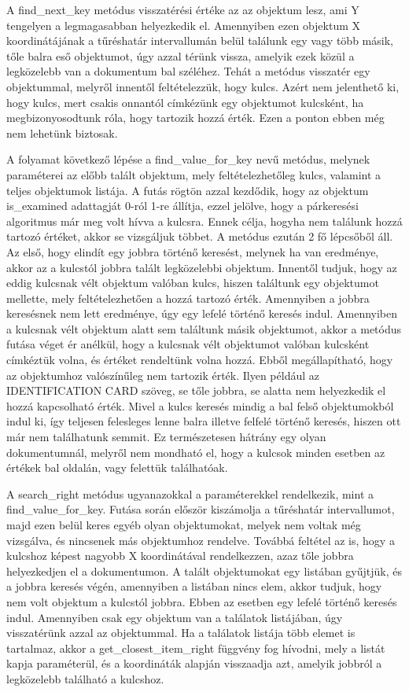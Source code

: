 \documentclass[12pt]{report}
\begin{document}
A find\_next\_key metódus visszatérési értéke az az objektum lesz, ami Y tengelyen a legmagasabban helyezkedik el. Amennyiben ezen objektum X koordinátájának a tűréshatár intervallumán belül találunk egy vagy több másik, tőle  balra eső objektumot, úgy azzal térünk vissza, amelyik ezek közül a legközelebb van a dokumentum bal széléhez. Tehát a metódus visszatér egy objektummal, melyről innentől feltételezzük, hogy kulcs. 
Azért nem jelenthető ki, hogy kulcs, mert csakis onnantól címkézünk egy objektumot kulcsként, ha megbizonyosodtunk róla, hogy tartozik hozzá érték. Ezen a ponton ebben még nem lehetünk biztosak.

A folyamat következő lépése a find\_value\_for\_key nevű metódus, melynek paraméterei az előbb talált objektum, mely feltételezhetőleg kulcs, valamint a teljes objektumok listája. A futás rögtön azzal kezdődik, hogy az objektum is\_examined adattagját 0-ról 1-re állítja, ezzel jelölve, hogy a párkeresési algoritmus már meg volt hívva a kulcsra. Ennek célja, hogyha nem találunk hozzá tartozó értéket, akkor se vizsgáljuk többet. A metódus ezután 2 fő lépcsőből áll. Az első, hogy elindít egy jobbra történő keresést, melynek ha van eredménye, akkor az a kulcstól jobbra talált legközelebbi objektum.
Innentől tudjuk, hogy az eddig kulcsnak vélt objektum valóban kulcs, hiszen találtunk egy objektumot mellette, mely feltételezhetően a hozzá tartozó érték. Amennyiben a jobbra keresésnek nem lett eredménye, úgy egy lefelé történő keresés indul. Amennyiben a kulcsnak vélt objektum alatt sem találtunk másik objektumot, akkor a metódus futása véget ér anélkül, hogy a kulcsnak vélt objektumot valóban kulcsként címkéztük volna, és értéket rendeltünk volna hozzá. Ebből megállapítható, hogy az objektumhoz valószínűleg nem tartozik érték.
Ilyen például az IDENTIFICATION CARD szöveg, se tőle jobbra, se alatta nem helyezkedik el hozzá kapcsolható érték.
Mivel a kulcs keresés mindig a bal felső objektumokból indul ki, így teljesen felesleges lenne balra illetve felfelé történő keresés, hiszen ott már nem találhatunk semmit. Ez természetesen hátrány egy olyan dokumentumnál, melyről nem mondható el, hogy a kulcsok minden esetben az értékek bal oldalán, vagy felettük találhatóak.

A search\_right metódus ugyanazokkal a paraméterekkel rendelkezik, mint a \break find\_value\_for\_key. Futása során először kiszámolja a tűréshatár intervallumot, majd ezen belül keres egyéb olyan objektumokat, melyek nem voltak még vizsgálva, és nincsenek más objektumhoz rendelve. Továbbá feltétel az is, hogy a kulcshoz képest nagyobb X koordinátával rendelkezzen, azaz tőle jobbra helyezkedjen el a dokumentumon.
A talált objektumokat egy listában gyűjtjük, és a jobbra keresés végén, amennyiben a listában nincs elem, akkor tudjuk, hogy nem volt objektum a kulcstól jobbra. Ebben az esetben egy lefelé történő keresés indul. Amennyiben csak egy objektum van a találatok listájában, úgy visszatérünk azzal az objektummal. Ha a találatok listája több elemet is tartalmaz, akkor a get\_closest\_item\_right függvény fog hívodni, mely a listát kapja paraméterül, és a koordináták alapján visszaadja azt, amelyik jobbról a legközelebb található a kulcshoz.
\end{document}
